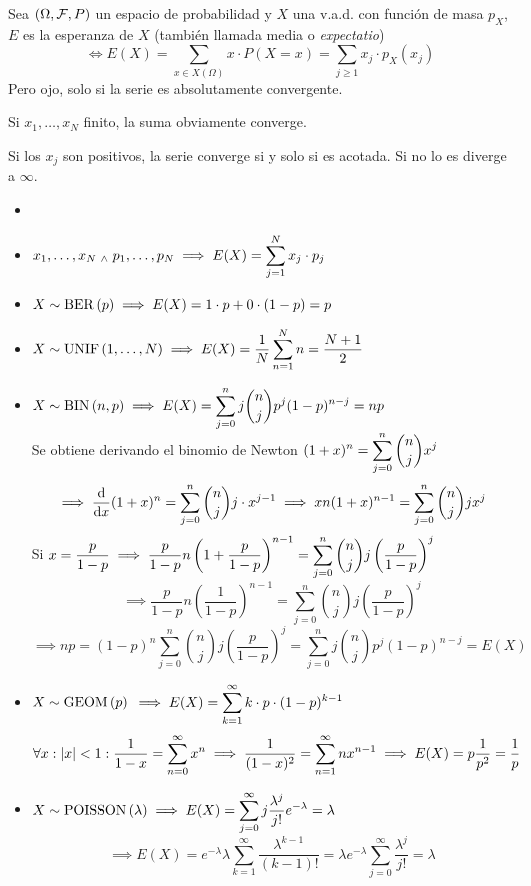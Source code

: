 \begin{defn}[Esperanza]
	Sea $(\Omega, \mathcal{F}, P)$ un espacio de probabilidad y $X$ una v.a.d. con función de masa $p_X$, $E$ es la esperanza de $X$ (también llamada media o \emph{expectatio})
	\[\iff E(X)=\sum_{x\in X(\Omega)}x\cdot P(X=x)=\sum_{j\geq 1}x_j\cdot p_X(x_j)\]
	Pero ojo, solo si la serie es absolutamente convergente.

	Si $x_1, \dots, x_N$ finito, la suma obviamente converge.
	
	Si los $x_j$ son positivos, la serie converge si y solo si es acotada. Si no lo es diverge a $\infty$.
\end{defn}

\begin{ejem}
	\begin{itemize}
		\item[]
		\item $\displaystyle x_1, \dots, x_N \; _{\wedge} \; p_1, \dots, p_N \implies E(X)=\sum_{j=1}^N x_j\cdot p_j$ 
		\item $\displaystyle X\sim\operatorname{BER}\left(p\right) \implies E(X)=1\cdot p+0\cdot(1-p)=p$
		\item $\displaystyle X\sim\operatorname{UNIF}\left(1, \dots, N\right) \implies E(X)=\frac{1}{N}\sum_{n=1}^N n = \frac{N+1}{2}$
		\item $\displaystyle X\sim\operatorname{BIN}\left(n, p\right) \implies E(X)=\sum_{j=0}^n j\binom{n}{j}p^j(1-p)^{n-j}=np$ \\
		Se obtiene derivando el binomio de Newton $\displaystyle (1+x)^n=\sum_{j=0}^n \binom{n}{j} x^j$
		\[\implies \odv{}{x}(1+x)^n=\sum_{j=0}^n \binom{n}{j} j\cdot x^{j-1} \implies xn(1+x)^{n-1}=\sum_{j=0}^n \binom{n}{j} jx^{j}\]
		Si $\displaystyle x=\frac{p}{1-p} \implies \frac{p}{1-p}n\left(1+\frac{p}{1-p}\right)^{n-1}=\sum_{j=0}^n \binom{n}{j} j\left(\frac{p}{1-p}\right)^{j}$
		\[\implies \frac{p}{1-p}n\left(\frac{1}{1-p}\right)^{n-1}=\sum_{j=0}^n \binom{n}{j} j\left(\frac{p}{1-p}\right)^{j}\]
		\[\implies np=(1-p)^n\sum_{j=0}^n \binom{n}{j} j\left(\frac{p}{1-p}\right)^{j} = \sum_{j=0}^n j\binom{n}{j}p^j(1-p)^{n-j} = E(X)\]
		\item $X\sim \operatorname{GEOM}\left(p\right)$ $\displaystyle \implies E(X)=\sum_{k=1}^\infty k\cdot p\cdot(1-p)^{k-1}$
		\[\forall  x :\left|x\right|<1: \frac{1}{1-x}=\sum_{n=0}^\infty x^n\implies \frac{1}{(1-x)^2}=\sum_{n=1}^\infty nx^{n-1}\implies E(X)= p \frac{1}{p^2}=\frac{1}{p}\]
		\item $\displaystyle X\sim\operatorname{POISSON}\left(\lambda\right) \implies E(X)=\sum_{j=0}^\infty j\frac{\lambda^j}{j!}e^{-\lambda}=\lambda$
		\[\implies E(X)=e^{-\lambda}\lambda\sum_{k=1}^\infty \frac{\lambda^{k-1}}{(k-1)!}=\lambda e^{-\lambda}\sum_{j=0}^{\infty} \frac{\lambda^j}{j!}=\lambda\]
	\end{itemize}
\end{ejem}

